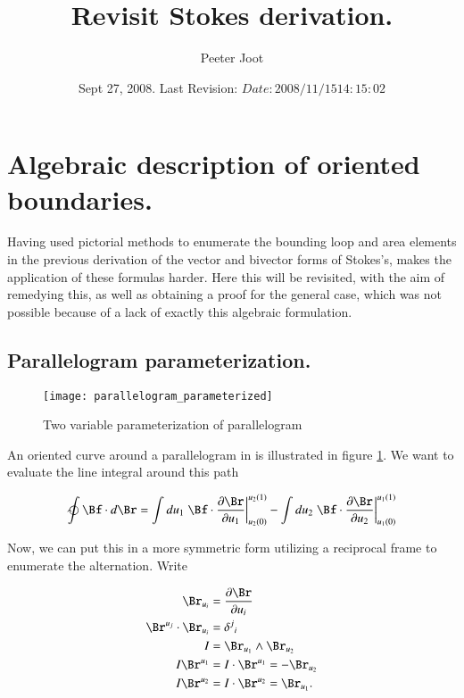 \documentclass{article}
\title{ Revisit Stokes derivation. }
\author{Peeter Joot}
\date{ Sept 27, 2008.  Last Revision: $Date: 2008/11/15 14:15:02 $ }
\newcommand{\PD}[2]{\frac{\partial {#2}}{\partial {#1}}}
\begin{document}
\maketitle{}

\tableofcontents

\section{ Algebraic description of oriented boundaries. }

Having used pictorial methods to enumerate the bounding loop and area elements 
\cite{PJStokes1}
in the previous derivation
of the vector and bivector forms of Stokes's, makes the application
of these formulas harder.  Here this will be revisited, with the aim of remedying this, as well as
obtaining a proof for the general case, which was not possible because of a lack of exactly this
algebraic formulation.

\subsection{ Parallelogram parameterization. }

\begin{figure}[htp]
\centering
\texttt{[image: parallelogram\_parameterized]}
\caption{Two variable parameterization of  parallelogram}\label{fig:parallelogram}
\end{figure}

An oriented curve around a parallelogram in  is illustrated in figure 
\ref{fig:parallelogram}.  We want to evaluate the line integral around this
path

\begin{align}\label{eqn:lineprep}
\ointclockwise \Bf \cdot d\Br
&=
\int du_1 \left.{\Bf \cdot \PD{u_1}{\Br} }\right\vert_{u_2(0)}^{u_2(1)}
-\int du_2 \left.{\Bf \cdot \PD{u_2}{\Br} }\right\vert_{u_1(0)}^{u_1(1)} \\
\end{align}

Now, we can put this in a more symmetric form utilizing a reciprocal 
frame to enumerate the alternation.  Write

\begin{align*}
\Br_{u_i} &= \PD{u_i}{\Br} \\
\Br^{u_j} \cdot \Br_{u_i} &= {\delta^j}_i \\
I &= \Br_{u_1} \wedge \Br_{u_2} \\
I \Br^{u_1} &=
I \cdot \Br^{u_1} =
- \Br_{u_2} \\
I \Br^{u_2} &=
I \cdot \Br^{u_2} =
 \Br_{u_1}.
\end{align*}
\end{document}
